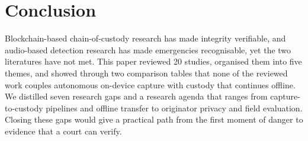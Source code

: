 \documentclass[conference,a4paper,10pt]{IEEEtran}
\begin{document}
\section{Conclusion}\label{sec:conclusion}
Blockchain-based chain-of-custody research has made integrity verifiable, and audio-based detection research has made emergencies recognisable, yet the two literatures have not met. This paper reviewed 20 studies, organised them into five themes, and showed through two comparison tables that none of the reviewed work couples autonomous on-device capture with custody that continues offline. We distilled seven research gaps and a research agenda that ranges from capture-to-custody pipelines and offline transfer to originator privacy and field evaluation. Closing these gaps would give a practical path from the first moment of danger to evidence that a court can verify.
\end{document}
